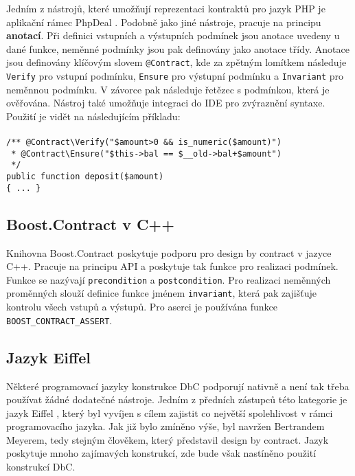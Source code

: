 			Jedním z nástrojů, které umožňují reprezentaci kontraktů pro jazyk PHP je aplikační rámec PhpDeal \cite{phpDeal}. Podobně jako jiné nástroje, pracuje na principu \textbf{\textcolor{pblue}{anotací}}. Při definici vstupních a výstupních podmínek jsou anotace uvedeny u dané funkce, neměnné podmínky jsou pak definovány jako anotace třídy. Anotace jsou definovány klíčovým slovem \texttt{@Contract}, kde za zpětným lomítkem následuje \texttt{Verify} pro vstupní podmínku, \texttt{Ensure} pro výstupní podmínku a \texttt{Invariant} pro neměnnou podmínku. V závorce pak následuje řetězec s podmínkou, která je ověřována. Nástroj také umožňuje integraci do IDE pro zvýraznění syntaxe. Použití je vidět na následujícím příkladu:\\\\
			\- \- \- \- \- \texttt{/** @Contract\textbackslash Verify("\$amount\textgreater 0 \&\& is\_numeric(\$amount)")}\\	
			\- \- \- \- \- \texttt{ * @Contract\textbackslash Ensure("\$this-\textgreater bal == \$\_\_old-\textgreater bal+\$amount")}\\
			\- \- \- \- \- \texttt{ */}\\
			\- \- \- \- \- \texttt{public function deposit(\$amount)}\\
			\- \- \- \- \- \texttt{\{ ... \}}
		
		\subsection{Boost.Contract v C++}
			Knihovna Boost.Contract \cite{boostContract} poskytuje podporu pro design by contract v jazyce C++. Pracuje na principu API a poskytuje tak funkce pro realizaci podmínek. Funkce se nazývají \texttt{precondition} a \texttt{postcondition}. Pro realizaci neměnných proměnných slouží definice funkce jménem \texttt{invariant}, která pak zajišťuje kontrolu všech vstupů a výstupů. Pro aserci je používána funkce \texttt{BOOST\_CONTRACT\_ASSERT}.
			
		
		\subsection{Jazyk Eiffel}
			Některé programovací jazyky konstrukce DbC podporují nativně a není tak třeba používat žádné dodatečné nástroje. Jedním z předních zástupců této kategorie je jazyk Eiffel \cite{eiffel}, který byl vyvíjen s cílem zajistit co největší spolehlivost v rámci programovacího jazyka. Jak již bylo zmíněno výše, byl navržen Bertrandem Meyerem, tedy stejným člověkem, který představil design by contract. Jazyk poskytuje mnoho zajímavých konstrukcí, zde bude však nastíněno použití konstrukcí DbC.\\
			
